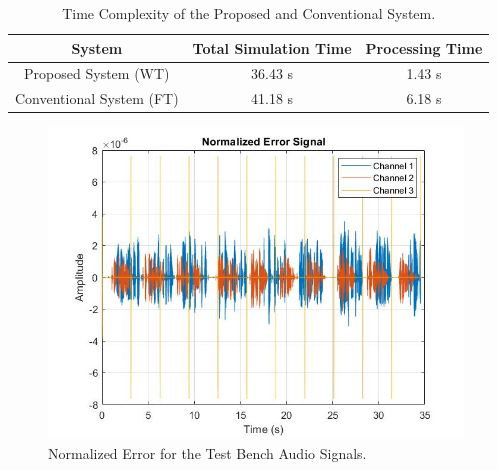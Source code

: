 \begin{table}[htpb]
    \centering
    \begin{tabular}{|c|c|c|}
    \hline
    System & Total Simulation Time & Processing Time \\
    \hline
         Proposed System (WT) & 36.43 s  & 1.43 s\\
         \hline
         Conventional System (FT) & 41.18 s & 6.18 s \\
         \hline
    \end{tabular}
    \caption{Time Complexity of the Proposed and Conventional System.}
    \label{tab:time}
\end{table}

\begin{figure}
    \centering
    \includegraphics[width=110mm]{TestBench_Error.jpg}
    \caption{Normalized Error for the Test Bench Audio Signals.}
    \label{fig:test_bench_error}
\end{figure}

\newpage

